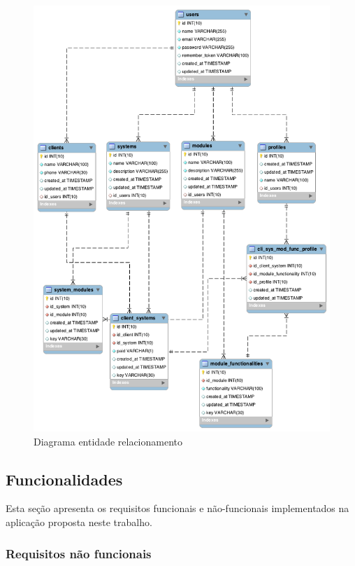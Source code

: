 \begin{figure}
	\label{fig:DER}
	\includegraphics[width=1\textwidth]{img/DER}
	\caption{Diagrama entidade relacionamento}
\end{figure}


\subsection{Funcionalidades}\label{funcionalidades}

Esta seção apresenta os requisitos funcionais e não-funcionais implementados na aplicação proposta neste trabalho.


\subsubsection{Requisitos não funcionais}



